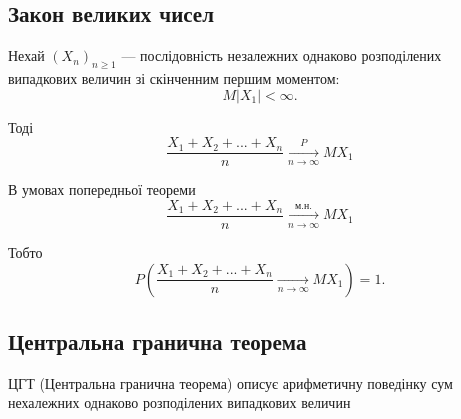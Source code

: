 \subsection{Закон великих чисел}

\begin{theorem}
    Нехай $(X_n)_{n \geqslant 1}$ --- послідовність
    незалежних однаково розподілених випадкових
    величин зі скінченним першим моментом:
    $$M|X_1| < \infty.$$
    
    Тоді
    \begin{equation}
        \dfrac{X_1 + X_2 + ... + X_n}{n} \xrightarrow[n \rightarrow \infty]{P} MX_1
    \end{equation}
\end{theorem}

\begin{theorem}
    В умовах попередньої теореми
    \begin{equation}
        \dfrac{X_1 + X_2 + ... + X_n}{n} \xrightarrow[n \rightarrow \infty]{\text{м.н.}} MX_1
    \end{equation}
    
    Тобто
    $$P\left(\dfrac{X_1 + X_2 + ... + X_n}{n} \xrightarrow[n \rightarrow \infty]{} MX_1\right) = 1.$$    
\end{theorem}


\subsection{Центральна гранична теорема}

ЦГТ (Центральна гранична теорема) описує арифметичну поведінку сум
нехалежних однаково розподілених випадкових величин

